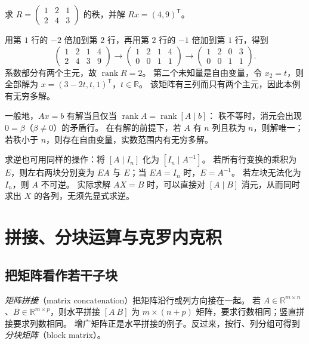 \documentclass[UTF8,12pt,a4paper,fontset=fandol]{ctexart}
\begin{document}
\begin{example}[用消元同时求秩与解方程]
求 $R=\begin{pmatrix}1&2&1\\2&4&3\end{pmatrix}$ 的秩，并解
$Rx=(4,9)^{\mathsf T}$。
\end{example}
\begin{solve}
用第 $1$ 行的 $-2$ 倍加到第 $2$ 行，再用第 $2$ 行的 $-1$ 倍加到第 $1$ 行，得到
\[
  \left(\begin{array}{ccc|c}1&2&1&4\\2&4&3&9\end{array}\right)
  \longrightarrow
  \left(\begin{array}{ccc|c}1&2&1&4\\0&0&1&1\end{array}\right)
  \longrightarrow
  \left(\begin{array}{ccc|c}1&2&0&3\\0&0&1&1\end{array}\right).
\]
系数部分有两个主元，故 $\operatorname{rank}R=2$。
第二个未知量是自由变量，令 $x_2=t$，则全部解为
$x=(3-2t,t,1)^{\mathsf T}$，$t\in\mathbb R$。
该矩阵有三列而只有两个主元，因此本例有无穷多解。
\end{solve}

一般地，$Ax=b$ 有解当且仅当 $\operatorname{rank}A=\operatorname{rank}[A\mid b]$：
秩不等时，消元会出现 $0=\beta$（$\beta\ne0$）的矛盾行。
在有解的前提下，若 $A$ 有 $n$ 列且秩为 $n$，则解唯一；若秩小于 $n$，则存在自由变量，实数范围内有无穷多解。

求逆也可用同样的操作：将 $[A\mid I_n]$ 化为 $[I_n\mid A^{-1}]$。
若所有行变换的乘积为 $E$，则左右两块分别变为 $EA$ 与 $E$；当 $EA=I_n$ 时，$E=A^{-1}$。
若左块无法化为 $I_n$，则 $A$ 不可逆。
实际求解 $AX=B$ 时，可以直接对 $[A\mid B]$ 消元，从而同时求出 $X$ 的各列，无须先显式求逆。

\section{拼接、分块运算与克罗内克积}

\subsection{把矩阵看作若干子块}

\emph{矩阵拼接}（matrix concatenation）把矩阵沿行或列方向接在一起。
若 $A\in\mathbb R^{m\times n}$、$B\in\mathbb R^{m\times p}$，则水平拼接 $[A\ B]$
为 $m\times(n+p)$ 矩阵，要求行数相同；竖直拼接要求列数相同。
增广矩阵正是水平拼接的例子。反过来，按行、列分组可得到\emph{分块矩阵}（block matrix）。
\end{document}
